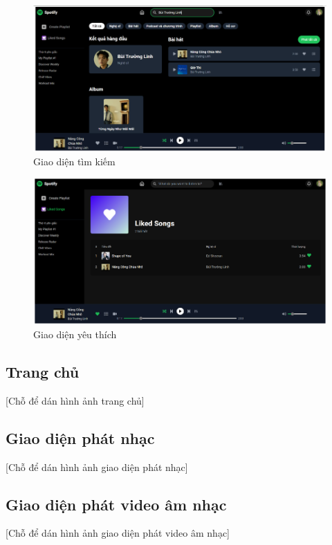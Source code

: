 \begin{figure}
    \centering
    \includegraphics[width=1\linewidth]{images/ui-search.png}
    \caption{Giao diện tìm kiếm}
    \label{fig:ui-search}
\end{figure}

\begin{figure}
    \centering
    \includegraphics[width=1\linewidth]{images/ui-favorite.png}
    \caption{Giao diện yêu thích}
    \label{fig:ui-favorite}
\end{figure}

\subsection{Trang chủ}
\label{subsec:homepage_ui}
[Chỗ để dán hình ảnh trang chủ]

\subsection{Giao diện phát nhạc}
\label{subsec:music_player_ui}
[Chỗ để dán hình ảnh giao diện phát nhạc]

\subsection{Giao diện phát video âm nhạc}
\label{subsec:video_player_ui}
[Chỗ để dán hình ảnh giao diện phát video âm nhạc]

